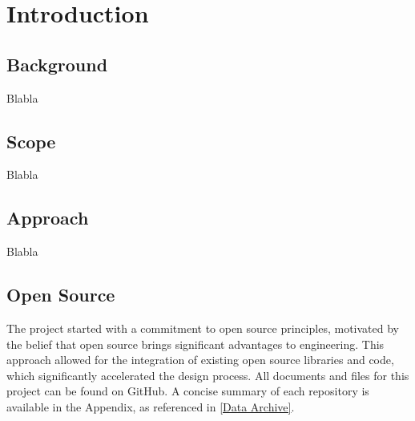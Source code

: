 \chapter{Introduction}
\section{Background}
Blabla

\section{Scope}
Blabla

\section{Approach}
Blabla


\section{Open Source}
The project started with a commitment to open source principles, motivated by the belief that open source brings significant advantages to engineering.
This approach allowed for the integration of existing open source libraries and code, which significantly accelerated the design process.
All documents and files for this project can be found on GitHub.
A concise summary of each repository is available in the Appendix, as referenced in \ref{Data Archive}.
